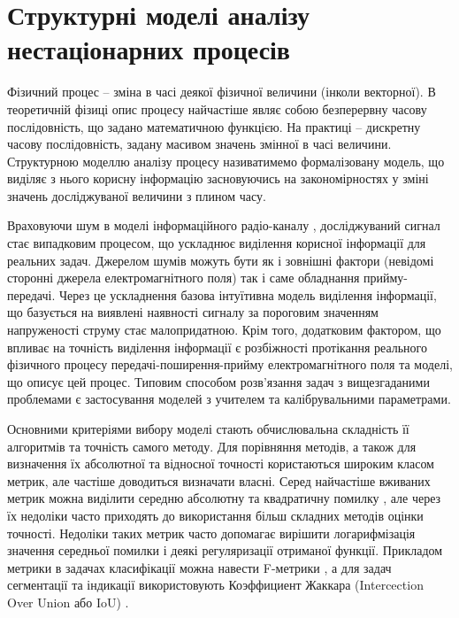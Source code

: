 \section{Структурні моделі аналізу нестаціонарних процесів}

Фізичний процес -- зміна в часі деякої фізичної величини (інколи векторної). 
В теоретичній фізиці опис процесу найчастіше являє собою безперервну часову 
послідовність, що задано математичною функцією. На практиці -- дискретну часову 
послідовність, задану масивом значень змінної в часі величини. Структурною 
моделлю аналізу процесу називатимемо формалізовану модель, що виділяє з нього 
корисну інформацію засновуючись на закономірностях у зміні значень 
досліджуваної величини з плином часу.

Враховуючи шум в моделі інформаційного радіо-каналу \cite{imp:Shihovcev2011}, 
досліджуваний сигнал стає випадковим процесом, що ускладнює виділення 
корисної інформації для реальних задач. Джерелом шумів можуть бути як і 
зовнішні фактори (невідомі сторонні джерела електромагнітного поля) так і
саме обладнання прийму-передачі. Через це ускладнення базова інтуїтивна модель
виділення інформації, що базується на виявлені наявності сигналу за 
пороговим значенням напруженості струму стає малопридатною. Крім того,
додатковим фактором, що впливає на точність виділення інформації є розбіжності
протікання реального фізичного процесу передачі-поширення-прийму 
електромагнітного поля та моделі, що описує цей процес. Типовим способом 
розв'язання задач з вищезгаданими проблемами є застосування моделей з учителем
та калібрувальними параметрами.


Основними критеріями вибору моделі стають обчислювальна складність її алгоритмів 
та точність самого методу. Для порівняння методів, а також для визначення їх 
абсолютної та відносної точності користаються широким класом метрик, але 
частіше доводиться визначати власні. Серед найчастіше вживаних метрик можна 
виділити середню абсолютну та квадратичну помилку \cite{imp:Willmott2005}, 
але через їх недоліки часто приходять до використання більш складних методів 
оцінки точності. Недоліки таких метрик часто допомагає вирішити логарифмізація 
значення середньої помилки і деякі регуляризації отриманої функції. 
Прикладом метрики в задачах класифікації можна навести F-метрики 
\cite{imp:Tharwat2018}, а для задач сегментації та індикації використовують 
Коэффициент Жаккара (Intercection Over Union або IoU) \cite{imp:Jaccard1901}.


